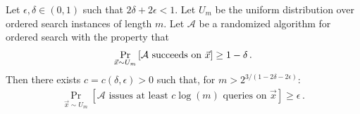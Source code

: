 \documentclass[11pt]{article}
\begin{document}
\begin{lemma} \label{lem:ordered-search-lower-bound}
Let $\epsilon, \delta \in (0,1)$ such that $2\delta + 2\epsilon < 1$. Let $U_m$ be the uniform distribution over ordered search instances of length $m$. Let $\mathcal{A}$ be a randomized algorithm for ordered search with the property that 
\begin{align}
    \Pr_{\vec{x} \sim U_m}\left[ \mathcal{A} \mbox{ succeeds on } \vec{x} \right] \geq 1-\delta\,. \notag 
\end{align}
Then there exists $c = c(\delta, \epsilon) > 0$ such that, for $m > 2^{3/(1-2\delta-2\epsilon)}$: 
\begin{align}
    \Pr_{\vec{x} \sim U_m} \left[\mathcal{A} \mbox{ issues at least } c \log(m) \mbox{ queries on } \vec{x} \right] \geq \epsilon\,.
\end{align}
\end{lemma}
\end{document}
